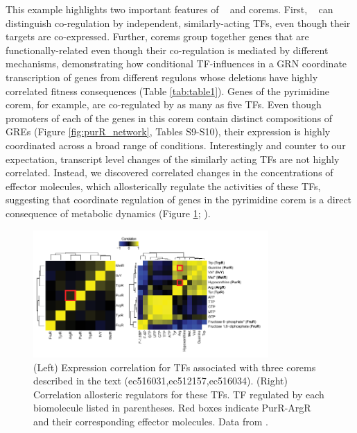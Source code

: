 This example highlights two important features of \egrine~ and corems. First, \egrine~ can distinguish co-regulation by independent, similarly-acting TFs, even though their targets are co-expressed. Further, corems group together genes that are functionally-related even though their co-regulation is mediated by different mechanisms, demonstrating how conditional TF-influences in a GRN coordinate transcription of genes from different regulons whose deletions have highly correlated fitness consequences (Table \ref{tab:table1}). Genes of the pyrimidine corem, for example, are co-regulated by as many as five TFs. Even though promoters of each of the genes in this corem contain distinct compositions of GREs (Figure \ref{fig:purR_network}, Tables S9-S10), their expression is highly coordinated across a broad range of conditions. Interestingly and counter to our expectation, transcript level changes of the similarly acting TFs are not highly correlated. Instead, we discovered correlated changes in the concentrations of effector molecules, which allosterically regulate the activities of these TFs, suggesting that coordinate regulation of genes in the pyrimidine corem is a direct consequence of metabolic dynamics (Figure \ref{fig:purR_effector}; \cite{ishii_multiple_2007}).

\begin{figure}[h!]
    \centering
    \includegraphics[width=0.8\textwidth]{figures/purR_effector}
 	\caption[Metabolite correlations may explain co-regulation within metabolically-linked corems]{(Left) Expression correlation for TFs associated with three corems described in the text (ec516031,ec512157,ec516034). (Right) Correlation allosteric regulators for these TFs. TF regulated by each biomolecule listed in parentheses. Red boxes indicate PurR-ArgR and their corresponding effector molecules. Data from \cite{ishii_multiple_2007}.
}
    \label{fig:purR_effector}
\end{figure}

